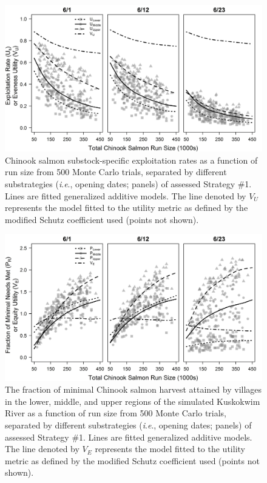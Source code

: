 \documentclass[12pt,]{book}
\theoremstyle{definition}
\theoremstyle{definition}
\theoremstyle{definition}
\theoremstyle{remark}
\begin{document}
\begin{singlespace}
\clearpage
\begin{figure}
  \centering
  \includegraphics{img/Ch3/U-v-N.jpg}
  \caption{Chinook salmon substock-specific exploitation rates as a function of run size from 500 Monte Carlo trials, separated by different substrategies (\textit{i}.\textit{e}., opening dates; panels) of assessed Strategy \#1. Lines are fitted generalized additive models. The line denoted by $V_U$ represents the model fitted to the utility metric as defined by the modified Schutz coefficient used (points not shown).}
  \label{fig:U-v-N}
\end{figure}

\clearpage
\begin{figure}
  \centering
  \includegraphics{img/Ch3/pNeed-v-N.jpg}
  \caption{The fraction of minimal Chinook salmon harvest attained by villages in the lower, middle, and upper regions of the simulated Kuskokwim River as a function of run size from 500 Monte Carlo trials, separated by different substrategies (\textit{i}.\textit{e}., opening dates; panels) of assessed Strategy \#1. Lines are fitted generalized additive models. The line denoted by $V_E$ represents the model fitted to the utility metric as defined by the modified Schutz coefficient used (points not shown).}
  \label{fig:pNeed-v-N}
\end{figure}


\end{singlespace}
\end{document}
